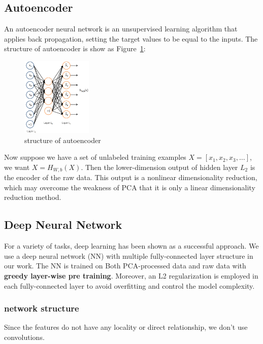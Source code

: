 \documentclass[sigconf]{acmart}
\begin{document}
\subsection{Autoencoder}
An autoencoder neural network \cite{ng2011sparse} is an unsupervised learning algorithm that applies back propagation, setting the target values to be equal to the inputs. The structure of autoencoder is show as Figure~\ref{auto_1}:
\begin{figure}[!ht]
	\centering
	\includegraphics[width=0.3\textwidth]{../figs/auto_1.png}
	\caption{structure of autoencoder}
	\label{auto_1}
	\centering
\end{figure}

Now suppose we have  a set of unlabeled training examples $X=[x_1,x_2,x_3,\dots]$, we want $X=H_{W,b}(X)$. Then the lower-dimension output of hidden layer $L_2$ is the encoder of the raw data. This output is a nonlinear dimensionality reduction, which may overcome the weakness of PCA that it is only a linear dimensionality reduction method.


\subsection{Deep Neural Network}
For a variety of tasks, deep learning \cite{Deeplearning} has been shown as a successful approach. We use a deep neural network (NN) with multiple fully-connected layer structure in our work. The NN is trained on Both PCA-processed data and raw data with \textbf{greedy layer-wise pre training}. Moreover, an L2 regularization is employed in each fully-connected layer to avoid overfitting and control the model complexity.
\subsubsection{network structure} Since the features do not have any locality or direct relationship, we don't use convolutions.\\
\end{document}
